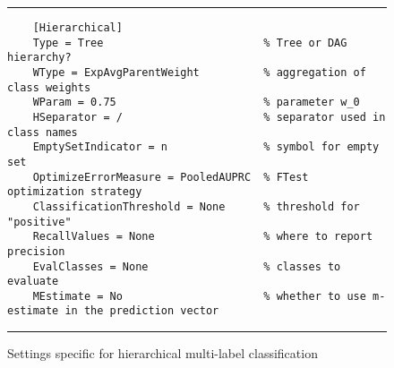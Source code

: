 \begin{figure}[htb]
	\hrule\vspace{1em}
	\begin{verbatim}
	[Hierarchical]
	Type = Tree                         % Tree or DAG hierarchy?
	WType = ExpAvgParentWeight          % aggregation of class weights
	WParam = 0.75                       % parameter w_0
	HSeparator = /                      % separator used in class names
	EmptySetIndicator = n               % symbol for empty set
	OptimizeErrorMeasure = PooledAUPRC  % FTest optimization strategy
	ClassificationThreshold = None      % threshold for "positive"
	RecallValues = None                 % where to report precision
	EvalClasses = None                  % classes to evaluate
	MEstimate = No                      % whether to use m-estimate in the prediction vector
	\end{verbatim}
	\hrule
	\caption{Settings specific for hierarchical multi-label classification}
	\label{settings-hmc:fig}
\end{figure}